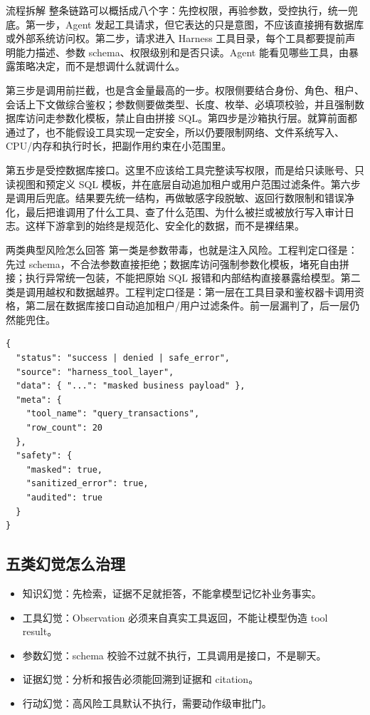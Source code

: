 \documentclass[12pt]{article}
\begin{document}
\begin{analysisBox}{流程拆解}
整条链路可以概括成八个字：先控权限，再验参数，受控执行，统一兜底。第一步，Agent 发起工具请求，但它表达的只是意图，不应该直接拥有数据库或外部系统访问权。第二步，请求进入 Harness 工具目录，每个工具都要提前声明能力描述、参数 schema、权限级别和是否只读。Agent 能看见哪些工具，由暴露策略决定，而不是想调什么就调什么。

第三步是调用前拦截，也是含金量最高的一步。权限侧要结合身份、角色、租户、会话上下文做综合鉴权；参数侧要做类型、长度、枚举、必填项校验，并且强制数据库访问走参数化模板，禁止自由拼接 SQL。第四步是沙箱执行层。就算前面都通过了，也不能假设工具实现一定安全，所以仍要限制网络、文件系统写入、CPU/内存和执行时长，把副作用约束在小范围里。

第五步是受控数据库接口。这里不应该给工具完整读写权限，而是给只读账号、只读视图和预定义 SQL 模板，并在底层自动追加租户或用户范围过滤条件。第六步是调用后兜底。结果要先统一结构，再做敏感字段脱敏、返回行数限制和错误净化，最后把谁调用了什么工具、查了什么范围、为什么被拦或被放行写入审计日志。这样下游拿到的始终是规范化、安全化的数据，而不是裸结果。
\end{analysisBox}

\begin{qaBox}{两类典型风险怎么回答}
第一类是参数带毒，也就是注入风险。工程判定口径是：先过 schema，不合法参数直接拒绝；数据库访问强制参数化模板，堵死自由拼接；执行异常统一包装，不能把原始 SQL 报错和内部结构直接暴露给模型。第二类是调用越权和数据越界。工程判定口径是：第一层在工具目录和鉴权器卡调用资格，第二层在数据库接口自动追加租户/用户过滤条件。前一层漏判了，后一层仍然能兜住。
\end{qaBox}

\begin{lstlisting}[caption={Harness 工具层统一输出结构示意}]
{
  "status": "success | denied | safe_error",
  "source": "harness_tool_layer",
  "data": { "...": "masked business payload" },
  "meta": {
    "tool_name": "query_transactions",
    "row_count": 20
  },
  "safety": {
    "masked": true,
    "sanitized_error": true,
    "audited": true
  }
}
\end{lstlisting}

\subsection{五类幻觉怎么治理}
\begin{itemize}[leftmargin=2em]
  \item 知识幻觉：先检索，证据不足就拒答，不能拿模型记忆补业务事实。
  \item 工具幻觉：Observation 必须来自真实工具返回，不能让模型伪造 tool result。
  \item 参数幻觉：schema 校验不过就不执行，工具调用是接口，不是聊天。
  \item 证据幻觉：分析和报告必须能回溯到证据和 citation。
  \item 行动幻觉：高风险工具默认不执行，需要动作级审批门。
\end{itemize}
\end{document}
